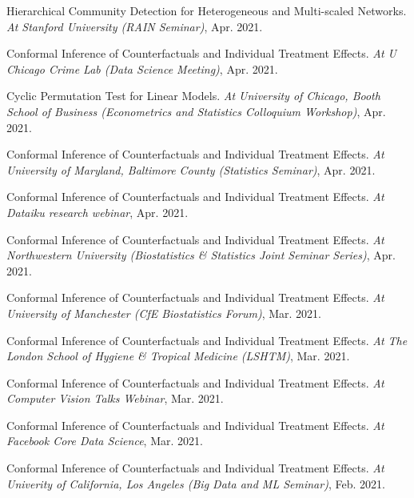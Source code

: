 \documentclass{article}
\begin{document}
\vspace{2mm}
Hierarchical Community Detection for Heterogeneous and Multi-scaled Networks. \emph{At Stanford University (RAIN Seminar)}, Apr. 2021.

\vspace{2mm}
Conformal Inference of Counterfactuals and Individual Treatment Effects. \emph{At U Chicago Crime Lab (Data Science Meeting)}, Apr. 2021.

\vspace{2mm}
Cyclic Permutation Test for Linear Models. \emph{At University of Chicago, Booth School of Business (Econometrics and Statistics Colloquium Workshop)}, Apr. 2021.

\vspace{2mm}
Conformal Inference of Counterfactuals and Individual Treatment Effects. \emph{At University of Maryland, Baltimore County (Statistics Seminar)}, Apr. 2021.

\vspace{2mm}
Conformal Inference of Counterfactuals and Individual Treatment Effects. \emph{At Dataiku research webinar}, Apr. 2021.

\vspace{2mm}
Conformal Inference of Counterfactuals and Individual Treatment Effects. \emph{At Northwestern University (Biostatistics \& Statistics Joint Seminar Series)}, Apr. 2021.

\vspace{2mm}
Conformal Inference of Counterfactuals and Individual Treatment Effects. \emph{At University of Manchester (CfE Biostatistics Forum)}, Mar. 2021.

\vspace{2mm}
Conformal Inference of Counterfactuals and Individual Treatment Effects. \emph{At The London School of Hygiene \& Tropical Medicine (LSHTM)}, Mar. 2021.

\vspace{2mm}
Conformal Inference of Counterfactuals and Individual Treatment Effects. \emph{At Computer Vision Talks Webinar}, Mar. 2021.

\vspace{2mm}
Conformal Inference of Counterfactuals and Individual Treatment Effects. \emph{At Facebook Core Data Science}, Mar. 2021.

\vspace{2mm}
Conformal Inference of Counterfactuals and Individual Treatment Effects. \emph{At Univerity of California, Los Angeles (Big Data and ML Seminar)}, Feb. 2021.
\end{document}
